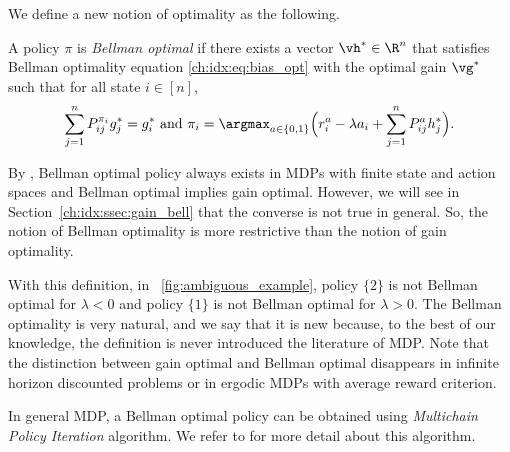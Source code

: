 


We define a new notion of optimality as the following.
\begin{defn}
    \label{ch:idx:defn:bell}
    A policy $\pi$ is \emph{Bellman optimal} if there exists a vector $\vh^*\in\R^n$ that satisfies Bellman optimality equation \eqref{ch:idx:eq:bias_opt} with the optimal gain $\vg^*$ such that for all state $i\in[n]$,
    \begin{equation}
        \label{ch:idx:eq:bell}
        \sum_{j=1}^nP^{\pi_i}_{ij}g^*_j =g^*_i \text{ and } \pi_i=\argmax_{a\in\{0,1\}} \Big(r^{a}_i - \lambda a_i + \sum_{j=1}^n P^{a}_{ij}h^*_j\Big).
    \end{equation}
\end{defn}
By \cite[Theorem~9.1.7]{puterman2014markov}, Bellman optimal policy always exists in MDPs with finite state and action spaces and Bellman optimal implies gain optimal.
However, we will see in Section~\ref{ch:idx:ssec:gain_bell} that the converse is not true in general.
So, the notion of Bellman optimality is more restrictive than the notion of gain optimality.

With this definition, in \figurename~\ref{fig:ambiguous_example}, policy $\{2\}$ is not Bellman optimal for $\lambda<0$ and policy $\{1\}$ is not Bellman optimal for $\lambda>0$.
The Bellman optimality is very natural, and we say that it is new because, to the best of our knowledge, the definition is never introduced the literature of MDP.
Note that the distinction between gain optimal and Bellman optimal disappears in infinite horizon discounted problems or in ergodic MDPs with average reward criterion.

In general MDP, a Bellman optimal policy can be obtained using \emph{Multichain Policy Iteration} algorithm.
We refer to \cite[Section~9.2.1]{puterman2014markov} for more detail about this algorithm.

